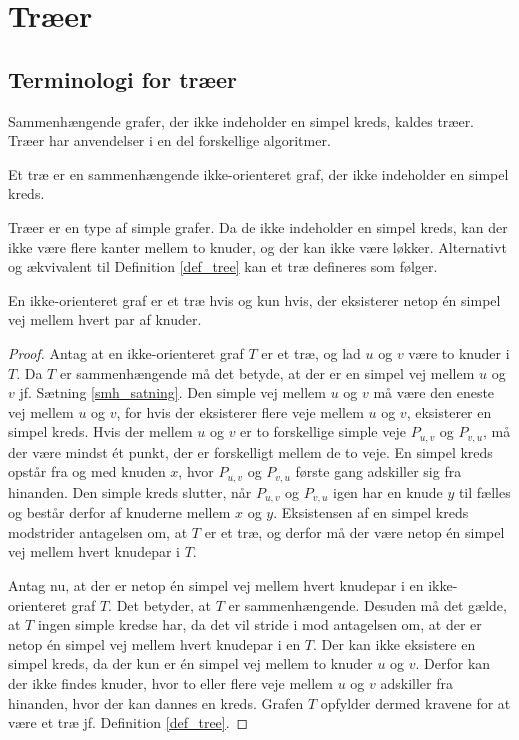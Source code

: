 \chapter{Træer}
\section{Terminologi for træer}

Sammenhængende grafer, der ikke indeholder en simpel kreds, kaldes træer. Træer har anvendelser i en del forskellige algoritmer.

\begin{defn}
Et træ er en sammenhængende ikke-orienteret graf, der ikke indeholder en simpel kreds.
\label{def_tree}
\end{defn}

Træer er en type af simple grafer. Da de ikke indeholder en simpel kreds, kan der ikke være flere kanter mellem to knuder, og der kan ikke være løkker. Alternativt og ækvivalent til Definition \ref{def_tree} kan et træ defineres som følger.

\begin{thm}
En ikke-orienteret graf er et træ hvis og kun hvis, der eksisterer netop én simpel vej mellem hvert par af knuder. 
\end{thm}

\begin{proof}
	Antag at en ikke-orienteret graf $T$ er et træ, og lad $u$ og $v$ være to knuder i $T$. 
	Da $T$ er sammenhængende må det betyde, at der er en simpel vej mellem $u$ og $v$ jf. Sætning \ref{smh_satning}. 
	Den simple vej mellem $u$ og $v$ må være den eneste vej mellem $u$ og $v$, for hvis der eksisterer flere veje mellem $u$ og $v$, eksisterer en simpel kreds. 
	Hvis der mellem $u$ og $v$ er to forskellige simple veje $P_{u,v}$ og $P_{v,u}$, må der være mindst ét punkt, der er forskelligt mellem de to veje. 
	En simpel kreds opstår fra og med knuden $x$, hvor $P_{u,v}$ og $P_{v,u}$ første gang adskiller sig fra hinanden. 
	Den simple kreds slutter, når $P_{u,v}$ og $P_{v,u}$ igen har en knude $y$ til fælles og består derfor af knuderne mellem $x$ og $y$.
	Eksistensen af en simpel kreds modstrider antagelsen om, at $T$ er et træ, og derfor må der være netop én simpel vej mellem hvert knudepar i $T$.

Antag nu, at der er netop én simpel vej mellem hvert knudepar i en ikke-orienteret graf $T$.
	Det betyder, at $T$ er sammenhængende. Desuden må det gælde, at $T$ ingen simple kredse har, da det vil stride i mod antagelsen om, at der er netop én simpel vej mellem hvert knudepar i en $T$.
	Der kan ikke eksistere en simpel kreds, da der kun er én simpel vej mellem to knuder $u$ og $v$. Derfor kan der ikke findes knuder, hvor to eller flere veje mellem $u$ og $v$ adskiller fra hinanden, hvor der kan dannes en kreds.
	Grafen $T$ opfylder dermed kravene for at være et træ jf. Definition \ref{def_tree}.
\end{proof}


